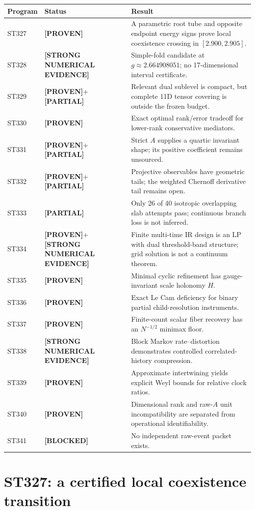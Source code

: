 \documentclass[11pt,a4paper]{article}
\newcommand{\Proven}{\textcolor{proved}{\textbf{[PROVEN]}}}\newcommand{\Evidence}{\textcolor{conditional}{\textbf{[STRONG NUMERICAL EVIDENCE]}}}\newcommand{\Partial}{\textcolor{conditional}{\textbf{[PARTIAL]}}}\newcommand{\Blocked}{\textcolor{blocked}{\textbf{[BLOCKED]}}}
\begin{document}
\begin{longtable}{p{}p{}p{}}
\toprule Program&Status&Result\\\midrule\endhead
ST327&\Proven&A parametric root tube and opposite endpoint energy signs prove local coexistence crossing in $[2.900,2.905]$.\\
ST328&\Evidence&Simple-fold candidate at $g\approx2.664908051$; no 17-dimensional interval certificate.\\
ST329&\Proven{}+\Partial&Relevant dual sublevel is compact, but complete 11D tensor covering is outside the frozen budget.\\
ST330&\Proven&Exact optimal rank/error tradeoff for lower-rank conservative mediators.\\
ST331&\Proven{}+\Partial&Strict $A$ supplies a quartic invariant shape; its positive coefficient remains unsourced.\\
ST332&\Proven{}+\Partial&Projective observables have geometric tails; the weighted Chernoff derivative tail remains open.\\
ST333&\Partial&Only 26 of 40 isotropic overlapping slab attempts pass; continuous branch loss is not inferred.\\
ST334&\Proven{}+\Evidence&Finite multi-time IR design is an LP with dual threshold-band structure; grid solution is not a continuum theorem.\\
ST335&\Proven&Minimal cyclic refinement has gauge-invariant scale holonomy $H$.\\
ST336&\Proven&Exact Le Cam deficiency for binary partial child-resolution instruments.\\
ST337&\Proven&Finite-count scalar fiber recovery has an $N^{-1/2}$ minimax floor.\\
ST338&\Evidence&Block Markov rate--distortion demonstrates controlled correlated-history compression.\\
ST339&\Proven&Approximate intertwining yields explicit Weyl bounds for relative clock ratios.\\
ST340&\Proven&Dimensional rank and raw-$A$ unit incompatibility are separated from operational identifiability.\\
ST341&\Blocked&No independent raw-event packet exists.\\
\bottomrule\end{longtable}\normalsize

\section{ST327: a certified local coexistence transition}
\end{document}
